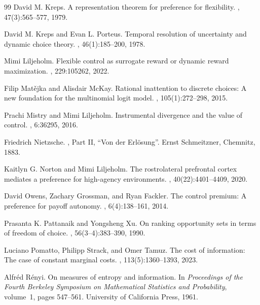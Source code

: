 \documentclass[11pt,a4paper]{article}
\theoremstyle{definition}
\newcommand{\1}{\mathbf 1}
\begin{document}
\begin{thebibliography}{99}
David M. Kreps.
\newblock A representation theorem for preference for flexibility.
, 47(3):565--577, 1979.

David M. Kreps and Evan L. Porteus.
\newblock Temporal resolution of uncertainty and dynamic choice theory.
, 46(1):185--200, 1978.

Mimi Liljeholm.
\newblock Flexible control as surrogate reward or dynamic reward maximization.
, 229:105262, 2022.

Filip Mat\v{e}jka and Alisdair McKay.
\newblock Rational inattention to discrete choices: A new foundation for the multinomial logit model.
, 105(1):272--298, 2015.

Prachi Mistry and Mimi Liljeholm.
\newblock Instrumental divergence and the value of control.
, 6:36295, 2016.

Friedrich Nietzsche.
, Part II, ``Von der Erl\"osung''.
\newblock Ernst Schmeitzner, Chemnitz, 1883.

Kaitlyn G. Norton and Mimi Liljeholm.
\newblock The rostrolateral prefrontal cortex mediates a preference for high-agency environments.
, 40(22):4401--4409, 2020.


David Owens, Zachary Grossman, and Ryan Fackler.
\newblock The control premium: A preference for payoff autonomy.
, 6(4):138--161, 2014.

Prasanta K. Pattanaik and Yongsheng Xu.
\newblock On ranking opportunity sets in terms of freedom of choice.
, 56(3--4):383--390, 1990.

Luciano Pomatto, Philipp Strack, and Omer Tamuz.
\newblock The cost of information: The case of constant marginal costs.
, 113(5):1360--1393, 2023.

Alfr\'ed R\'enyi.
\newblock On measures of entropy and information.
\newblock In {\em Proceedings of the Fourth Berkeley Symposium on Mathematical Statistics and Probability}, volume~1,
  pages 547--561. University of California Press, 1961.


\end{thebibliography}
\end{document}
